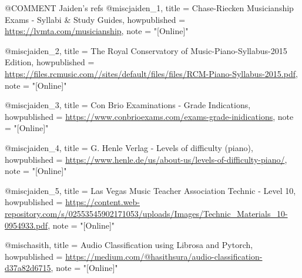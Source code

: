 @COMMENT Jaiden's refs
@misc{jaiden_1,
  title = {Chase-Riecken Musicianship Exams - Syllabi \& Study Guides},
  howpublished = {\url{https://lvmta.com/musicianship}},
  note = "[Online]"
}

@misc{jaiden_2,
  title = {The Royal Conservatory of Music-Piano-Syllabus-2015 Edition},
  howpublished = {\url{https://files.rcmusic.com//sites/default/files/files/RCM-Piano-Syllabus-2015.pdf}},
  note = "[Online]"
}

@misc{jaiden_3,
  title = {Con Brio Examinations - Grade Indications},
  howpublished = {\url{https://www.conbrioexams.com/exams-grade-inidications}},
  note = "[Online]"
}

@misc{jaiden_4,
  title = {G. Henle Verlag - Levels of difficulty (piano)},
  howpublished = {\url{https://www.henle.de/us/about-us/levels-of-difficulty-piano/}},
  note = "[Online]"
}

@misc{jaiden_5,
  title = {Las Vegas Music Teacher Association Technic - Level 10},
  howpublished = {\url{https://content.web-repository.com/s/02553545902171053/uploads/Images/Technic_Materials_10-0954933.pdf}},
  note = "[Online]"
}

@misc{hasith,
  title = {Audio Classification using Librosa and Pytorch},
  howpublished = {\url{https://medium.com/@hasithsura/audio-classification-d37a82d6715}},
  note = "[Online]"
}